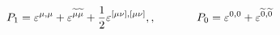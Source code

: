 \begin{equation}
P_1=\varepsilon ^{\mu ,\mu }+\varepsilon ^{\widetilde{\mu
}\widetilde{\mu }}+\frac 12\varepsilon ^{[\mu \nu ],[\mu \nu ]} ,
,\hspace{0.5in}P_0=\varepsilon ^{0,0}+\varepsilon
^{\widetilde{0},\widetilde{0}} \label{18}
\end{equation}

